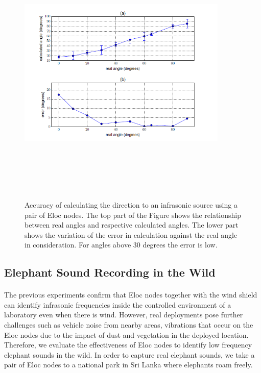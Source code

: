 \documentclass[12pt]{article}
\numberwithin{figure}{section}
\numberwithin{table}{section}
\begin{document}
\begin{figure}[H]
\centering
\includegraphics[width=10cm,height=13cm,keepaspectratio]{error_angles.png}
\caption[Accuracy of calculating the direction to an infrasonic
source using a pair of Eloc nodes.]{Accuracy of calculating the direction to an infrasonic
source using a pair of Eloc nodes. The top part of the Figure shows the relationship between real angles and respective
calculated angles. The lower part shows the variation of
the error in calculation against the real angle in consideration.
For angles above 30 degrees the error is low.}
\label{error:angle}
\end{figure}

\subsection{Elephant Sound Recording in the Wild}

\paragraph{}
The previous experiments confirm that Eloc nodes together with the wind shield can identify infrasonic frequencies inside the controlled environment of a laboratory even when there is wind. However, real deployments pose further challenges such as vehicle noise from nearby areas, vibrations that occur on the Eloc nodes due to the impact of dust and vegetation in the deployed location. Therefore, we evaluate the effectiveness of Eloc nodes to identify low frequency elephant sounds in the wild. In order to capture real elephant sounds, we take a pair of Eloc nodes to a national park in Sri Lanka where elephants roam freely.
\end{document}
